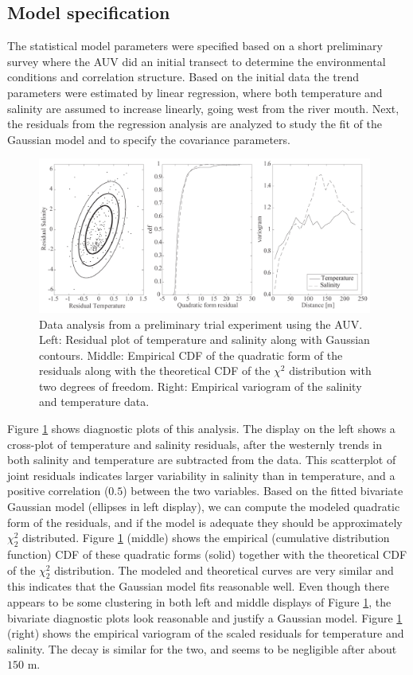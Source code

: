 \documentclass[aoas]{imsart}
\begin{document}
\subsection{Model specification}

The statistical model parameters were specified based on a short preliminary survey where the AUV did an initial transect to determine the environmental conditions and correlation structure. Based on the initial data the trend parameters were estimated by linear regression, where both temperature and salinity are assumed to increase linearly, going west from the river mouth. Next, the residuals from the regression analysis are analyzed to study the fit of the Gaussian model and to specify the covariance parameters.

\begin{figure}[!h] 
 \centering 
\includegraphics[width=0.98\textwidth]{Figures/field-trials/res_diag.pdf}
\caption{Data analysis from a preliminary trial experiment using the
  AUV. Left: Residual plot of temperature and salinity along with
  Gaussian contours. Middle: Empirical CDF of the quadratic form of
  the residuals along with the theoretical CDF of the $\chi^2$
  distribution with two degrees of freedom. Right: Empirical variogram
  of the salinity and temperature data.} \label{fig:parest}
\end{figure}

Figure \ref{fig:parest} shows diagnostic plots of this analysis. The display on the left shows a cross-plot of temperature and salinity residuals, after the westernly trends in both salinity and temperature are subtracted from the data. This scatterplot of joint residuals indicates larger variability in salinity than in temperature, and a positive correlation ($0.5$) between the two variables. Based on the fitted bivariate Gaussian model (ellipses in left display), we can compute the modeled quadratic form of the residuals, and if the model is adequate they should be approximately $\chi^2_2$ distributed. Figure \ref{fig:parest} (middle) shows the empirical (cumulative distribution function) CDF of these quadratic forms (solid) together with the theoretical CDF of the $\chi^2_2$ distribution. The modeled and theoretical curves are very similar and this indicates that the Gaussian model fits reasonable well. Even though there appears to be some clustering in both left and middle displays of Figure \ref{fig:parest}, the bivariate diagnostic plots look reasonable and justify a Gaussian model. Figure \ref{fig:parest} (right) shows the empirical variogram of the scaled residuals for temperature and salinity. The decay is similar for the two, and seems to be negligible after about $150$ m. 
\end{document}
